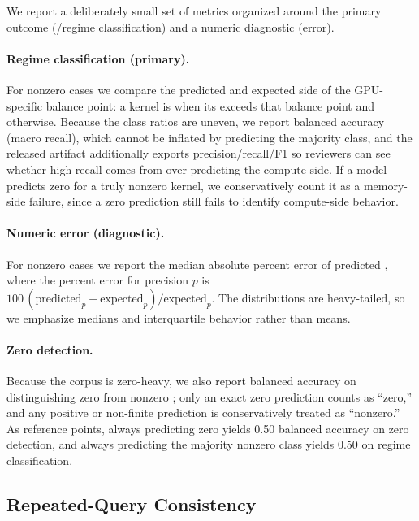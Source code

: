 We report a deliberately small set of metrics organized around the primary outcome (\bandwidthbound/\computebound regime classification) and a numeric diagnostic (\rai error).

\paragraph{Regime classification (primary).}
For nonzero cases we compare the predicted and expected side of the GPU-specific balance point: a kernel is \computebound when its \rai exceeds that balance point and \bandwidthbound otherwise.
Because the class ratios are uneven, we report balanced accuracy (macro recall), which cannot be inflated by predicting the majority class, and the released artifact additionally exports \computebound precision/recall/F1 so reviewers can see whether high recall comes from over-predicting the compute side.
If a model predicts zero for a truly nonzero kernel, we conservatively count it as a memory-side failure, since a zero prediction still fails to identify compute-side behavior.

\paragraph{Numeric \rai error (diagnostic).}
For nonzero cases we report the median absolute percent error of predicted \rai, where the percent error for precision $p$ is $100\,(\text{predicted}_p - \text{expected}_p)/\text{expected}_p$.
The distributions are heavy-tailed, so we emphasize medians and interquartile behavior rather than means.

\paragraph{Zero detection.}
Because the corpus is zero-heavy, we also report balanced accuracy on distinguishing zero from nonzero \rai; only an exact zero prediction counts as ``zero,'' and any positive or non-finite prediction is conservatively treated as ``nonzero.''
As reference points, always predicting zero yields 0.50 balanced accuracy on zero detection, and always predicting the majority nonzero class yields 0.50 on regime classification.

\subsection{Repeated-Query Consistency}

